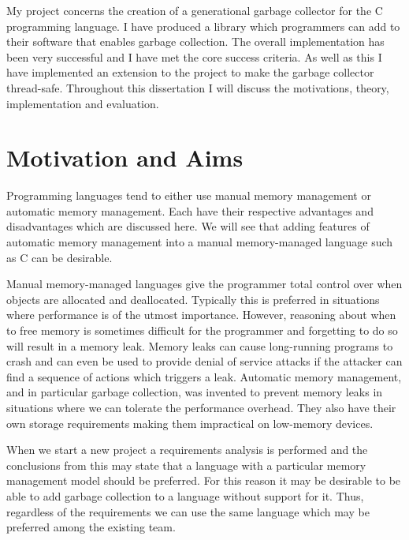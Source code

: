 \documentclass[../diss.tex]{subfiles}
\begin{document}
My project concerns the creation of a generational garbage collector for the C programming language. I have produced a library which programmers can add to their software that enables garbage collection. The overall implementation has been very successful and I have met the core success criteria. As well as this I have implemented an extension to the project to make the garbage collector thread-safe. Throughout this dissertation I will discuss the motivations, theory, implementation and evaluation.

\section{Motivation and Aims}

Programming languages tend to either use manual memory management or automatic memory management. Each have their respective advantages and disadvantages which are discussed here. We will see that adding features of automatic memory management into a manual memory-managed language such as C can be desirable.

Manual memory-managed languages give the programmer total control over when objects are allocated and deallocated. Typically this is preferred in situations where performance is of the utmost importance. However, reasoning about when to free memory is sometimes difficult for the programmer and forgetting to do so will result in a memory leak. Memory leaks can cause long-running programs to crash and can even be used to provide denial of service attacks if the attacker can find a sequence of actions which triggers a leak. Automatic memory management, and in particular garbage collection, was invented to prevent memory leaks in situations where we can tolerate the performance overhead. They also have their own storage requirements making them impractical on low-memory devices.

When we start a new project a requirements analysis is performed and the conclusions from this may state that a language with a particular memory management model should be preferred. For this reason it may be desirable to be able to add garbage collection to a language without support for it. Thus, regardless of the requirements we can use the same language which may be preferred among the existing team. 
\end{document}
